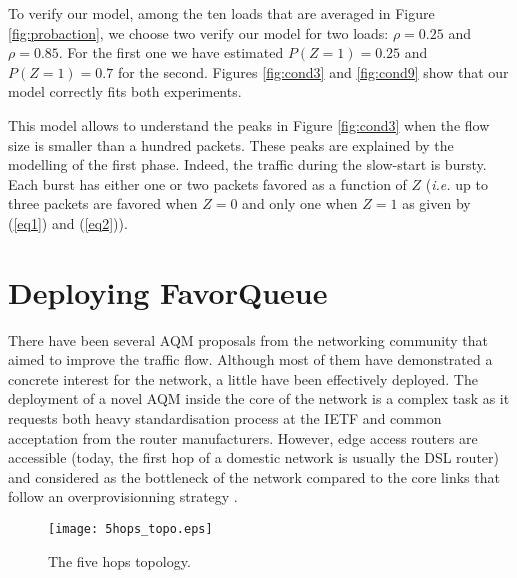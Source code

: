 \documentclass{elsart}
\begin{document}
To verify our model, among the ten loads that are averaged in Figure \ref{fig:probaction}, we choose two verify our model for two loads: $\rho=0.25$ and $\rho=0.85$.
For the first one we have estimated $P(Z=1)=0.25$ and $P(Z=1)=0.7$ for the second. Figures \ref{fig:cond3} and \ref{fig:cond9} show that our model correctly fits both experiments.

This model allows to understand the peaks in Figure \ref{fig:cond3} when the flow size is smaller than a hundred packets. These peaks are explained by the modelling of the first phase. Indeed, the traffic during the slow-start is bursty. Each burst has either one or two packets favored as a function of $Z$ (\textit{i.e.} up to three packets are favored when $Z=0$ and only one when $Z=1$ as given by (\ref{eq1}) and (\ref{eq2})).

\section{Deploying FavorQueue}
\label{sec:5hops}

There have been several AQM proposals from the networking community that aimed to improve the traffic flow. Although most of them have demonstrated a concrete interest for the network, a little have been effectively deployed. The deployment of a novel AQM inside the core of the network is a complex task as it requests both heavy standardisation process at the IETF and common acceptation from the router manufacturers. However, edge access routers are accessible (today, the first hop of a domestic network is usually the DSL router) and considered as the bottleneck of the network compared to the core links that follow an overprovisionning strategy \cite{poplevel}. 

\begin{figure}[htb!]
   	\centering
	\texttt{[image: 5hops\_topo.eps]}
	\caption{The five hops topology.}
	\label{fig:5hops}
\end{figure}
\end{document}
